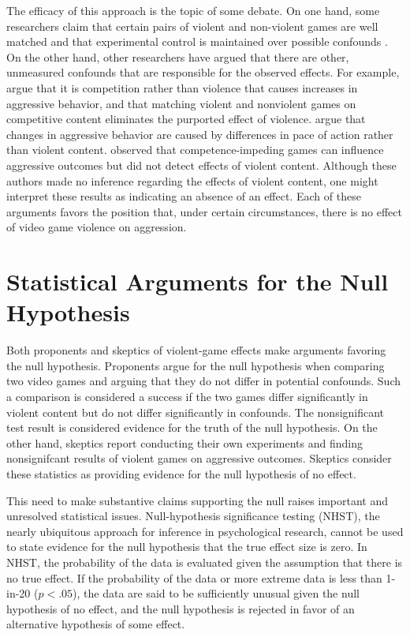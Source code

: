 \documentclass[man]{apa6}
\begin{document}
The efficacy of this approach is the topic of some debate. On one hand, some researchers claim that certain pairs of violent and non-violent games are well matched and that experimental control is maintained over possible confounds \citep[e.g.,][]{Anderson:etal:2004}. On the other hand, other researchers have argued that there are other, unmeasured confounds that are responsible for the observed effects.  For example, \citet{Adachi:Willoughby:2011} argue that it is competition rather than violence that causes increases in aggressive behavior, and that matching violent and nonviolent games on competitive content eliminates the purported effect of violence. \citet{Elson:etal:2013} argue that changes in aggressive behavior are caused by differences in pace of action rather than violent content.  \citet{Przybylski:etal:2014} observed that competence-impeding games can influence aggressive outcomes but did not detect effects of violent content. Although these authors made no inference regarding the effects of violent content, one might interpret these results as indicating an absence of an effect. Each of these arguments favors the position that, under certain circumstances, there is no effect of video game violence on aggression.  

\section{Statistical Arguments for the Null Hypothesis}
Both proponents and skeptics of violent-game effects make arguments favoring the null hypothesis. Proponents argue for the null hypothesis when comparing two video games and arguing that they do not differ in potential confounds. Such a comparison is considered a success if the two games differ significantly in violent content but do not differ significantly in confounds. The nonsignificant test result is considered evidence for the truth of the null hypothesis. On the other hand, skeptics report conducting their own experiments and finding nonsignifcant results of violent games on aggressive outcomes. Skeptics consider these statistics as providing evidence for the null hypothesis of no effect.

This need to make substantive claims supporting the null raises important and unresolved statistical issues. Null-hypothesis significance testing (NHST), the nearly ubiquitous approach for inference in psychological research, cannot be used to state evidence for the null hypothesis that the true effect size is zero.  In NHST, the probability of the data is evaluated given the assumption that there is no true effect. If the probability of the data or more extreme data is less than 1-in-20 ($p<.05$), the data are said to be sufficiently unusual given the null hypothesis of no effect, and the null hypothesis is rejected in favor of an alternative hypothesis of some effect.
\end{document}
